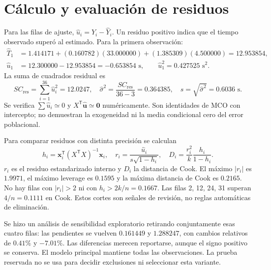 \documentclass[11pt,a4paper]{article}
\begin{document}
\section{Cálculo y evaluación de residuos}
Para las filas de ajuste, $\hat u_i=Y_i-\widehat Y_i$. Un residuo positivo indica que el tiempo observado superó al estimado. Para la primera observación:
\begin{align*}
\widehat T_1&=1.414171+(0.160782)(33.000000)+(1.385309)(4.500000)=12.953854,\\
\hat u_1&=12.300000-12.953854=-0.653854\text{ s},\qquad \hat u_1^2=0.427525\text{ s}^2.
\end{align*}
La suma de cuadrados residual es
\[
SC_{\mathrm{res}}=\sum_{i=1}^{36}\hat u_i^2=12.0247,\quad
\hat\sigma^2=\frac{SC_{\mathrm{res}}}{36-3}=0.364385,\quad s=\sqrt{\hat\sigma^2}=0.6036\text{ s}.
\]
Se verifica $\sum\hat u_i\simeq0$ y $X^{\mathsf T}\hat{\boldsymbol u}\simeq\boldsymbol0$ numéricamente. Son identidades de MCO con intercepto; no demuestran la exogeneidad ni la media condicional cero del error poblacional.

Para comparar residuos con distinta precisión se calculan
\[
h_i=\boldsymbol x_i^{\mathsf T}(X^{\mathsf T}X)^{-1}\boldsymbol x_i,\quad
r_i=\frac{\hat u_i}{s\sqrt{1-h_i}},\quad
D_i=\frac{r_i^2}{k}\frac{h_i}{1-h_i}.
\]
$r_i$ es el residuo estandarizado interno y $D_i$ la distancia de Cook. El máximo $|r_i|$ es $1.9971$, el máximo leverage es $0.1595$ y la máxima distancia de Cook es $0.2165$. No hay filas con $|r_i|>2$ ni con $h_i>2k/n=0.1667$. Las filas 2, 12, 24, 31 superan $4/n=0.1111$ en Cook. Estos cortes son señales de revisión, no reglas automáticas de eliminación.

Se hizo un análisis de sensibilidad exploratorio retirando conjuntamente esas cuatro filas: las pendientes se vuelven $0.161449$ y $1.288247$, con cambios relativos de $0.41\%$ y $-7.01\%$. Las diferencias merecen reportarse, aunque el signo positivo se conserva. El modelo principal mantiene todas las observaciones. La prueba reservada no se usa para decidir exclusiones ni seleccionar esta variante.
\end{document}
